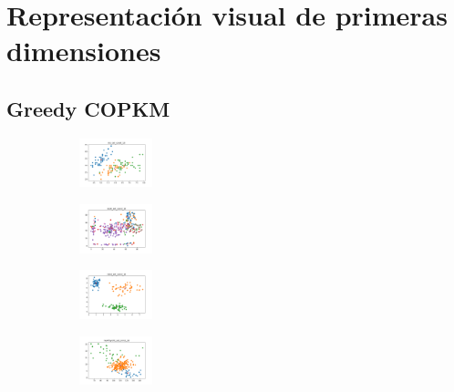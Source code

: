 \appendix

\section{Representación visual de primeras dimensiones}

\subsection{Greedy COPKM}

\vspace*{\fill}

\begin{figure}[H]    
    \centering
    \begin{subfigure}
        \centering
        \includegraphics[width=0.234\textwidth]{img/copkm/iris_set_const_10_949004259_clust.png}
    \end{subfigure}
    \hfill
    \begin{subfigure}
        \centering
        \includegraphics[width=0.234\textwidth]{img/copkm/ecoli_set_const_10_949004259_clust.png}
    \end{subfigure}
    \hfill
    \begin{subfigure}
        \centering
        \includegraphics[width=0.234\textwidth]{img/copkm/rand_set_const_10_949004259_clust.png}
    \end{subfigure}
    \hfill
    \begin{subfigure}
        \centering
        \includegraphics[width=0.234\textwidth]{img/copkm/newthyroid_set_const_10_949004259_clust.png}

\end{subfigure}
\end{figure}
